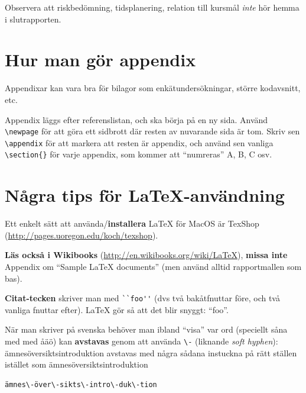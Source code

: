 \documentclass[a4paper,12pt]{article}
\begin{document}
Observera att risk\-be\-döm\-ning, tids\-planering, relation till kursmål \emph{inte} hör hemma i slutrapporten.
\newpage

%



\newpage
\appendix %
\section{Hur man gör appendix}
Appendixar kan vara bra för bilagor som enkätundersökningar, större kodavsnitt, etc.

Appendix läggs efter referenslistan, och ska börja på en ny sida. Använd \verb|\newpage| för att göra ett sidbrott där resten av nuvarande sida är tom. Skriv sen \verb|\appendix| för att markera att resten är appendix, och
 använd sen vanliga \verb|\section{}| för varje appendix, som kommer att ``numreras'' A, B, C osv.

\section{Några tips för La\TeX-användning}

Ett enkelt sätt att använda/\textbf{installera} LaTeX för MacOS är TexShop (\url{http://pages.uoregon.edu/koch/texshop}).

\textbf{Läs också i Wikibooks} (\url{http://en.wikibooks.org/wiki/LaTeX}), \textbf{missa inte} Appendix om ``Sample LaTeX documents'' (men använd alltid rapportmallen som bas).

\textbf{Citat-tecken} skriver man med \verb|``foo''| (dvs två bakåtfnuttar före, och två vanliga fnuttar efter). LaTeX gör så att det blir snyggt: ``foo''.

När man skriver på svenska behöver man ibland ``visa'' var ord (speciellt såna med med åäö) kan \textbf{avstavas} genom att använda \verb|\-| (liknande \textit{soft hyphen}): ämnesöversiktsintroduktion avstavas med några sådana instuckna på rätt ställen istället som ämnes\-över\-sikts\-intro\-duk\-tion

\begin{verbatim}
ämnes\-över\-sikts\-intro\-duk\-tion
\end{verbatim}
\end{document}
